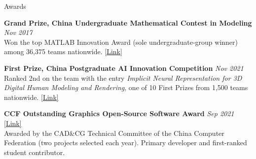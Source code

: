 \begin{rSection}{Awards}

    {\bf Grand Prize, China Undergraduate Mathematical Contest in Modeling} \hfill {\em Nov 2017} \\
    Won the top MATLAB Innovation Award (sole undergraduate-group winner) among 36,375 teams nationwide. \href{https://www.mcm.edu.cn/html_cn/node/bcf1ba1418779fab1ee5f10717b95bfc.html}{[Link]}

    {\bf First Prize, China Postgraduate AI Innovation Competition} \hfill {\em Nov 2021} \\
    Ranked 2nd on the team with the entry \emph{Implicit Neural Representation for 3D Digital Human Modeling and Rendering}, one of 10 First Prizes from 1,500 teams nationwide.
    \href{https://cpipc.acge.org.cn/cw/detail/2c9088a5696cbf370169a3f8101510bd/2c90800c7da2aae7017db76b3abf07c6}{[Link]}

    {\bf CCF Outstanding Graphics Open-Source Software Award} \hfill {\em Sep 2021} \, \href{http://tc.ccf.org.cn/tccad/jlry/txkyrjj/hjrxx/2021-09-01/735710.shtml}{[Link]} \\
    Awarded by the CAD\&CG Technical Committee of the China Computer Federation (two projects selected each year). Primary developer and first-ranked student contributor.

\end{rSection}

